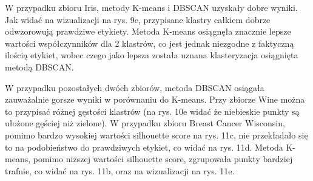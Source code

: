 \documentclass[12pt]{article}
\begin{document}
W przypadku zbioru Iris, metody K-means i DBSCAN uzyskały dobre wyniki. Jak widać na wizualizacji na rys. 9e, przypisane klastry całkiem dobrze odwzorowują prawdziwe etykiety.
Metoda K-means osiągnęła znacznie lepsze wartości współczynników dla 2 klastrów, co jest jednak niezgodne z faktyczną ilością etykiet, wobec czego jako lepsza została uznana klasteryzacja osiągnięta metodą DBSCAN.

W przypadku pozostałych dwóch zbiorów, metoda DBSCAN osiągała zauważalnie gorsze wyniki w porównaniu do K-means.
Przy zbiorze Wine można to przypisać różnej gęstości klastrów (na rys. 10e widać że niebieskie punkty są ułożone gęściej niż zielone).
W przypadku zbioru Breast Cancer Wisconsin, pomimo bardzo wysokiej wartości silhouette score na rys. 11c, nie przekładało się to na podobieństwo do prawdziwych etykiet, co widać na rys. 11d.
Metoda K-means, pomimo niższej wartości silhouette score, zgrupowała punkty bardziej trafnie, co widać na rys. 11b, oraz na wizualizacji na rys. 11e.
\end{document}
